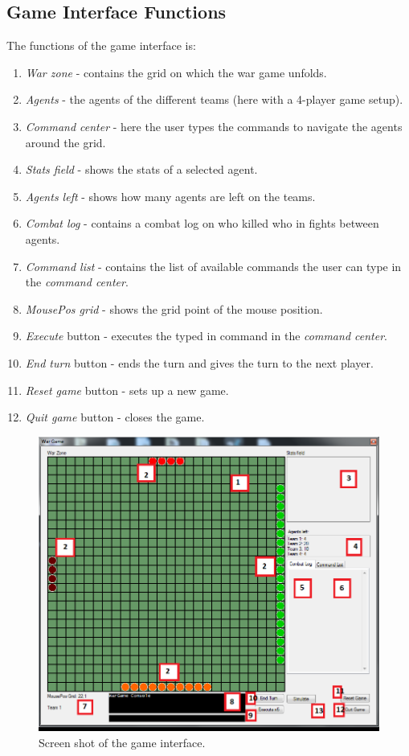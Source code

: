 \subsection*{Game Interface Functions}
The functions of the game interface is:
\begin{enumerate}
	\item \textit{War zone} - contains the grid on which the war game unfolds.
	\item \textit{Agents} - the agents of the different teams (here with a 4-player game setup).
	\item \textit{Command center} - here the user types the commands to navigate the agents around the grid.
	\item \textit{Stats field} - shows the stats of a selected agent.
	\item \textit{Agents left} - shows how many agents are left on the teams.
	\item \textit{Combat log} - contains a combat log on who killed who in fights between agents.
	\item \textit{Command list} - contains the list of available commands the user can type in the \textit{command center}.
	\item \textit{MousePos grid} - shows the grid point of the mouse position.
	\item \textit{Execute} button - executes the typed in command in the \textit{command center}.
	\item \textit{End turn} button - ends the turn and gives the turn to the next player.
	\item \textit{Reset game} button - sets up a new game.
	\item \textit{Quit game} button - closes the game.
\end{enumerate}

\begin{figure}[H]
\begin{center}
\includegraphics[scale=0.6]{Images/game_interface_2.png}
\end{center}
\caption{Screen shot of the game interface.}
\label{game_interface}
\end{figure}

